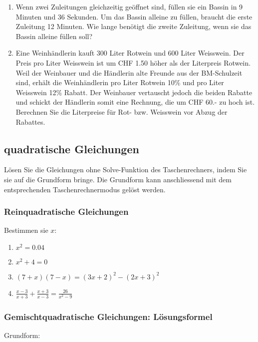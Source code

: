 \begin{enumerate}
\item Wenn zwei Zuleitungen gleichzeitig geöffnet sind, füllen sie ein
  Bassin in 9 Minuten und 36 Sekunden. Um das Bassin alleine zu
  füllen, braucht die erste Zuleitung 12 Minuten. Wie lange benötigt
  die zweite Zuleitung, wenn sie das Bassin alleine füllen soll?

\item Eine Weinhändlerin kauft 300 Liter Rotwein und 600 Liter
  Weisswein. Der Preis pro Liter Weisswein ist um CHF 1.50 höher als der
  Literpreis Rotwein. Weil der Weinbauer und die Händlerin alte
  Freunde aus der BM-Schulzeit sind, erhält die Weinhändlerin pro
  Liter Rotwein 10\% und pro Liter Weisswein 12\% Rabatt.
  Der Weinbauer vertauscht jedoch die beiden Rabatte und schickt der
  Händlerin somit eine Rechnung, die um CHF 60.- zu hoch ist.
  Berechnen Sie die Literpreise für Rot- bzw. Weisswein vor Abzug der
  Rabattes.
\end{enumerate}


\subsection{quadratische Gleichungen}

  Lösen Sie die Gleichungen ohne Solve-Funktion des Taschenrechners,
  indem Sie sie auf die Grundform bringe. Die Grundform kann
  anschliessend mit dem entsprechenden Taschenrechnermodus gelöst
  werden.

  \subsubsection{Reinquadratische Gleichungen}
  Bestimmen sie $x$:
  \begin{multicols}{2}
  \begin{enumerate}
  \item $x^2 = 0.04$
  \item $x^2+4=0$
  \item $(7+x)(7-x)=(3x+2)^2-(2x+3)^2$
    \item $\frac{x-3}{x+3} + \frac{x+3}{x-3} = \frac{26}{x^2-9}$
  \end{enumerate}
  \end{multicols}

  \subsubsection{Gemischtquadratische Gleichungen: Lösungsformel}
  Grundform:

